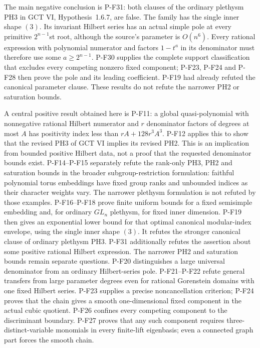\documentclass[11pt,a4paper]{article}
\begin{document}
The main negative conclusion is P-F31: both clauses of the ordinary
plethysm PH3 in GCT VI, Hypothesis~1.6.7, are false. The family has
the single inner shape $(3)$. Its invariant Hilbert series has an
actual simple pole at every primitive $2^{n-1}$st root, although the
source's parameter is $O(n^6)$. Every rational expression with
polynomial numerator and factors $1-t^a$ in its denominator must
therefore use some $a\ge2^{n-1}$. P-F30 supplies the complete
support classification that excludes every competing nonzero fixed
component; P-F23, P-F24 and P-F28 then prove the pole and its leading
coefficient. P-F19 had already refuted the canonical parameter clause.
These results do not refute the narrower PH2 or saturation bounds.

A central positive result obtained here is P-F11: a global
quasi-polynomial with nonnegative rational Hilbert numerator and
$r$ denominator factors of degrees at most $A$ has positivity index
less than $rA+128r^3A^3$. P-F12 applies this to show that the revised
PH3 of GCT VI implies its revised PH2. This is an implication from
bounded positive Hilbert data, not a proof that the requested
denominator bounds exist.
P-F14--P-F15 separately refute the rank-only PH3, PH2 and saturation
bounds in the broader subgroup-restriction formulation: faithful
polynomial torus embeddings have fixed group ranks and unbounded
indices as their character weights vary. The narrower plethysm
formulation is not refuted by those examples.
P-F16--P-F18 prove finite uniform bounds for a fixed semisimple
embedding and, for ordinary $GL_n$ plethysm, for fixed inner dimension.
P-F19 then gives an exponential lower bound for that optimal canonical
modular-index envelope, using the single inner shape $(3)$.
It refutes the stronger canonical clause of ordinary plethysm PH3.
P-F31 additionally refutes the assertion about some positive rational
Hilbert expression. The narrower PH2 and saturation bounds remain
separate questions.
P-F20 distinguishes a large universal denominator from an ordinary
Hilbert-series pole. P-F21--P-F22 refute general transfers from large
parameter degrees even for rational Gorenstein domains with one fixed
Hilbert series. P-F23 supplies a precise noncancellation criterion;
P-F24 proves that the chain gives a smooth one-dimensional fixed
component in the actual cubic quotient. P-F26 confines every competing component
to the discriminant boundary. P-F27 proves that any such component
requires three-distinct-variable monomials in every finite-lift
eigenbasis; even a connected graph part forces the smooth chain.
\end{document}
